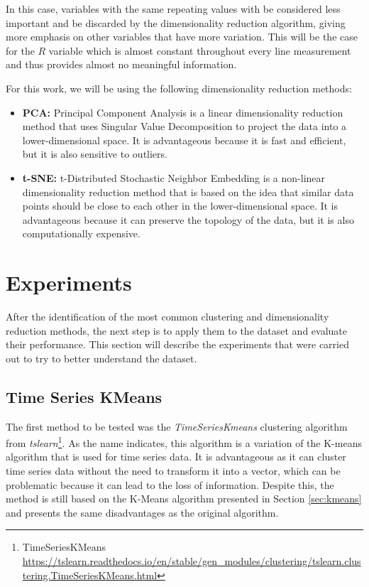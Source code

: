 In this case, variables with the same repeating values with be considered less important and be discarded by the dimensionality reduction algorithm, giving more emphasis on other variables that have more variation. This will be the case for the $R$ variable which is almost constant throughout every line measurement and thus provides almost no meaningful information.

For this work, we will be using the following dimensionality reduction methods:

\begin{itemize}
    \item \textbf{PCA:} Principal Component Analysis is a linear dimensionality reduction method that uses Singular Value Decomposition to project the data into a lower-dimensional space. It is advantageous because it is fast and efficient, but it is also sensitive to outliers.
    \item \textbf{t-SNE:} t-Distributed Stochastic Neighbor Embedding is a non-linear dimensionality reduction method that is based on the idea that similar data points should be close to each other in the lower-dimensional space. It is advantageous because it can preserve the topology of the data, but it is also computationally expensive.
\end{itemize}

\section{Experiments}\label{sec:clustering_experiments}
After the identification of the most common clustering and dimensionality reduction methods, the next step is to apply them to the dataset and evaluate their performance. This section will describe the experiments that were carried out to try to better understand the dataset.

\subsection{Time Series KMeans}\label{sec:time_series_methods}
The first method to be tested was the \textit{TimeSeriesKmeans} clustering algorithm from \textit{tslearn}\footnote{TimeSeriesKMeans \url{https://tslearn.readthedocs.io/en/stable/gen_modules/clustering/tslearn.clustering.TimeSeriesKMeans.html}}. As the name indicates, this algorithm is a variation of the K-means algorithm that is used for time series data. It is advantageous as it can cluster time series data without the need to transform it into a vector, which can be problematic because it can lead to the loss of information. Despite this, the method is still based on the K-Means algorithm presented in Section \ref{sec:kmeans} and presents the same disadvantages as the original algorithm. 

